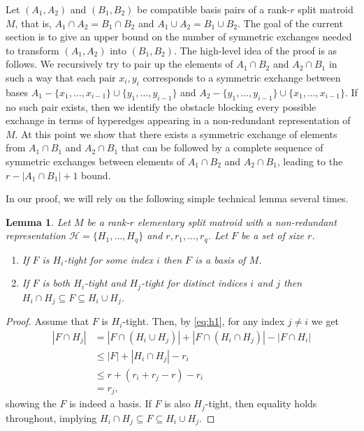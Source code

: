 \documentclass[11pt,a4paper]{article}
\theoremstyle{plain}
\newtheorem{lem}[thm]{Lemma}
\theoremstyle{definition}
\newcommand{\cH}{\mathcal{H}}
\begin{document}
Let $(A_1,A_2)$ and $(B_1,B_2)$ be compatible basis pairs of a rank-$r$ split matroid $M$, that is, $A_1\cap A_2=B_1\cap B_2$ and $A_1\cup A_2=B_1\cup B_2$. The goal of the current section is to give an upper bound on the number of symmetric exchanges needed to transform $(A_1,A_2)$ into $(B_1,B_2)$. The high-level idea of the proof is as follows. We recursively try to pair up the elements of $A_1\cap B_2$ and $A_2\cap B_1$ in such a way that each pair $x_i,y_i$ corresponds to a symmetric exchange between bases $A_1-\{x_1,\dots,x_{i-1}\}\cup\{y_1,\dots,y_{i-1}\}$ and $A_2-\{y_1,\dots,y_{i-1}\}\cup\{x_1,\dots,x_{i-1}\}$. If no such pair exists, then we identify the obstacle blocking every possible exchange in terms of hyperedges appearing in a non-redundant representation of $M$. At this point we show that there exists a symmetric exchange of elements from $A_1\cap B_1$ and $A_2\cap B_1$ that can be followed by a complete sequence of symmetric exchanges between elements of $A_1\cap B_2$ and $A_2\cap B_1$, leading to the $r-|A_1\cap B_1|+1$ bound. 

In our proof, we will rely on the following simple technical lemma several times. 

\begin{lem}\label{lem:tight}
Let $M$ be a rank-$r$ elementary split matroid with a non-redundant representation $\cH=\{H_1,\dots,H_q\}$ and $r,r_1,\dots,r_q$. Let $F$ be a set of size $r$.
\begin{enumerate}[label={(\alph*)}] \itemsep0em
    \item If $F$ is $H_i$-tight for some index $i$ then $F$ is a basis of $M$.\label{it:basis}
    \item If $F$ is both $H_i$-tight and $H_j$-tight for distinct indices $i$ and $j$ then $H_i\cap H_j\subseteq F\subseteq H_i\cup H_j$.\label{it:f}
\end{enumerate} 
\end{lem}
\begin{proof}
Assume that $F$ is $H_i$-tight. Then, by \ref{eq:h1}, for any index $j\neq i$ we get
\begin{align*}
    |F\cap H_j|
    {}&{}= 
    |F\cap (H_i\cup H_j)|+|F\cap (H_i\cap H_j)|-|F\cap H_i|\\
    {}&{}\leq 
    |F|+|H_i\cap H_j|-r_i\\
    {}&{}\leq 
    r+(r_i+r_j-r)-r_i\\
    {}&{}=
    r_j,
\end{align*}
showing the $F$ is indeed a basis. If $F$ is also $H_j$-tight, then equality holds throughout, implying $H_i\cap H_j\subseteq F\subseteq H_i\cup H_j$. 
\end{proof}
\end{document}
